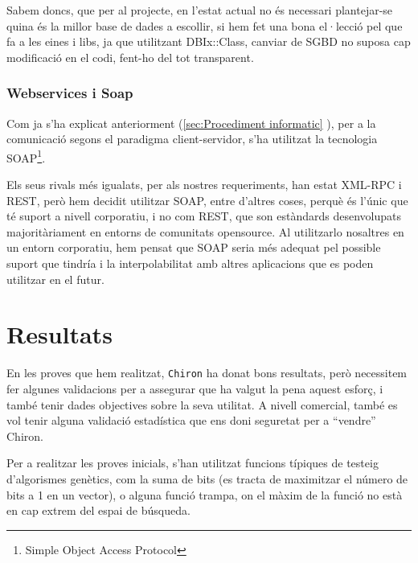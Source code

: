 \documentclass[titlepage,a4paper,12pt]{book}
\begin{document}
Sabem doncs, que per al projecte, en l'estat actual no és necessari plantejar-se
quina és la millor base de dades a escollir, si hem fet una bona el·lecció pel
que fa a les eines i libs, ja que utilitzant DBIx::Class, canviar de SGBD no
suposa cap modificació en el codi, fent-ho del tot transparent.


\subsubsection{Webservices i Soap} %
\label{ssub:WS i Soap}

Com ja s'ha explicat anteriorment (\ref{sec:Procediment informatic} ), per a la
comunicació segons el paradigma client-servidor, s'ha utilitzat la tecnologia
SOAP\footnote{Simple Object Access Protocol}.

Els seus rivals més igualats, per als nostres requeriments, han estat XML-RPC i
REST, però hem decidit utilitzar SOAP, entre d'altres coses, perquè és l'únic
que té suport a nivell corporatiu, i no com REST, que son estàndards
desenvolupats majoritàriament en entorns de comunitats opensource.  Al
utilitzarlo nosaltres en un entorn corporatiu, hem pensat que SOAP seria més
adequat pel possible suport que tindría i la interpolabilitat amb altres
aplicacions que es poden utilitzar en el futur.


\section{Resultats} %
	\label{sec:Resultats}

	En les proves que hem realitzat, \texttt{Chiron} ha donat bons resultats,
	però necessitem fer algunes validacions per a assegurar que ha valgut la
	pena aquest esforç, i també tenir dades objectives sobre la seva utilitat.
	A nivell comercial, també es vol tenir alguna validació estadística que ens
	doni seguretat per a ``vendre'' Chiron.

	Per a realitzar les proves inicials, s'han utilitzat funcions típiques de
	testeig d'algorismes genètics, com la suma de bits (es tracta de maximitzar
	el número de bits a 1 en un vector), o alguna funció trampa, on el màxim de
	la funció no està en cap extrem del espai de búsqueda.
\end{document}
